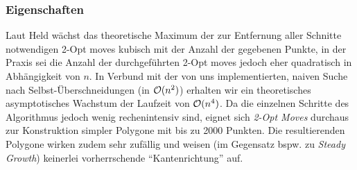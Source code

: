   \subsubsection{Eigenschaften}

    Laut Held wächst das theoretische Maximum der zur Entfernung aller Schnitte
    notwendigen 2-Opt moves kubisch mit der Anzahl der gegebenen Punkte, in der
    Praxis sei die Anzahl der durchgeführten 2-Opt moves jedoch eher quadratisch
    in Abhängigkeit von $n$. In Verbund mit der von uns implementierten, naiven
    Suche nach Selbst-Überschneidungen (in $\mathcal{O}(n^2)$) erhalten wir ein 
    theoretisches
    asymptotisches Wachstum der Laufzeit von $\mathcal{O}(n^4)$. Da die einzelnen
    Schritte des Algorithmus jedoch wenig rechenintensiv sind, eignet sich
    \emph{2-Opt Moves} durchaus zur Konstruktion simpler Polygone mit bis zu
    2000 Punkten. Die resultierenden Polygone wirken zudem sehr zufällig und
    weisen (im Gegensatz bspw. zu \emph{Steady Growth}) keinerlei vorherrschende
    \enquote{Kantenrichtung} auf.
    